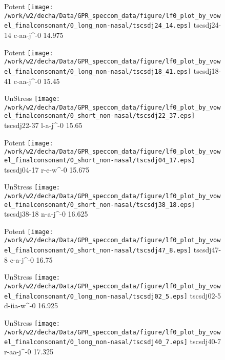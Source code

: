 \documentclass{article}
\begin{document}
\begin{figure}[t]
\begin{minipage}[b]{.24\textwidth}
\colorbox{Apricot}{Potent}
\centering
\texttt{[image: /work/w2/decha/Data/GPR\_speccom\_data/figure/lf0\_plot\_by\_vowel\_finalconsonant/0\_long\_non-nasal/tscsdj24\_14.eps]}
tscsdj24-14 c-aa-j\textasciicircum-0 14.975
\end{minipage}
\begin{minipage}[b]{.24\textwidth}
\colorbox{Apricot}{Potent}
\centering
\texttt{[image: /work/w2/decha/Data/GPR\_speccom\_data/figure/lf0\_plot\_by\_vowel\_finalconsonant/0\_long\_non-nasal/tscsdj18\_41.eps]}
tscsdj18-41 c-aa-j\textasciicircum-0 15.45
\end{minipage}
\begin{minipage}[b]{.24\textwidth}
UnStress
\centering
\texttt{[image: /work/w2/decha/Data/GPR\_speccom\_data/figure/lf0\_plot\_by\_vowel\_finalconsonant/0\_short\_non-nasal/tscsdj22\_37.eps]}
tscsdj22-37 l-a-j\textasciicircum-0 15.65
\end{minipage}
\begin{minipage}[b]{.24\textwidth}
\colorbox{Apricot}{Potent}
\centering
\texttt{[image: /work/w2/decha/Data/GPR\_speccom\_data/figure/lf0\_plot\_by\_vowel\_finalconsonant/0\_short\_non-nasal/tscsdj04\_17.eps]}
tscsdj04-17 r-e-w\textasciicircum-0 15.675
\end{minipage}
\end{figure}
\clearpage
\begin{figure}[t]
\begin{minipage}[b]{.24\textwidth}
UnStress
\centering
\texttt{[image: /work/w2/decha/Data/GPR\_speccom\_data/figure/lf0\_plot\_by\_vowel\_finalconsonant/0\_short\_non-nasal/tscsdj38\_18.eps]}
tscsdj38-18 n-a-j\textasciicircum-0 16.625
\end{minipage}
\begin{minipage}[b]{.24\textwidth}
\colorbox{Apricot}{Potent}
\centering
\texttt{[image: /work/w2/decha/Data/GPR\_speccom\_data/figure/lf0\_plot\_by\_vowel\_finalconsonant/0\_short\_non-nasal/tscsdj47\_8.eps]}
tscsdj47-8 c-a-j\textasciicircum-0 16.75
\end{minipage}
\begin{minipage}[b]{.24\textwidth}
UnStress
\centering
\texttt{[image: /work/w2/decha/Data/GPR\_speccom\_data/figure/lf0\_plot\_by\_vowel\_finalconsonant/0\_long\_non-nasal/tscsdj02\_5.eps]}
tscsdj02-5 d-iia-w\textasciicircum-0 16.925
\end{minipage}
\begin{minipage}[b]{.24\textwidth}
UnStress
\centering
\texttt{[image: /work/w2/decha/Data/GPR\_speccom\_data/figure/lf0\_plot\_by\_vowel\_finalconsonant/0\_long\_non-nasal/tscsdj40\_7.eps]}
tscsdj40-7 r-aa-j\textasciicircum-0 17.325
\end{minipage}
\end{figure}
\end{document}
